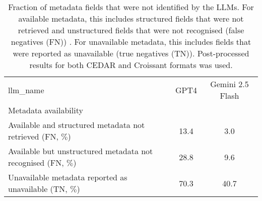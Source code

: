\begin{table}
\caption{Fraction of metadata fields that were not identified by the LLMs. For available metadata, this includes structured fields that were not retrieved and unstructured fields that were not recognised (false negatives (FN)) . For unavailable metadata, this includes fields that were reported as unavailable (true negatives (TN)). Post-processed results for both CEDAR and Croissant formats was used.}
\label{tab:metadata_not_found}
\begin{tabular}{lcc}
\toprule
llm_name & GPT4 & Gemini 2.5 Flash \\
Metadata availability &  &  \\
\midrule
Available and structured metadata not retrieved (FN, $\%$) & 13.4 & 3.0 \\
Available but unstructured metadata not recognised (FN, $\%$) & 28.8 & 9.6 \\
Unavailable metadata reported as unavailable (TN, $\%$) & 70.3 & 40.7 \\
\bottomrule
\end{tabular}
\end{table}

